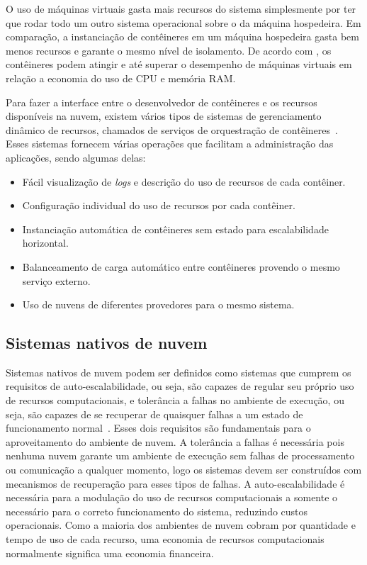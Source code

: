 O uso de máquinas virtuais gasta mais recursos do sistema simplesmente por ter que rodar todo um outro sistema operacional sobre o da máquina hospedeira. Em comparação, a instanciação de contêineres em um máquina hospedeira gasta bem menos recursos e garante o mesmo nível de isolamento. De acordo com  \cite{7095802}, os contêineres podem atingir e até superar o desempenho de máquinas virtuais em relação a economia do uso de CPU e memória RAM. %

Para fazer a interface entre o desenvolvedor de contêineres e os recursos disponíveis na nuvem, existem vários tipos de sistemas de gerenciamento dinâmico de recursos, chamados de serviços de orquestração de contêineres~\citep{Kubernetes,Mesos,Swarm}. Esses sistemas fornecem várias operações que facilitam a administração das aplicações, sendo algumas delas:
\begin{itemize}
    \item Fácil visualização de \textit{logs} e descrição do uso de recursos de cada contêiner.
    \item Configuração individual do uso de recursos por cada contêiner.
    \item Instanciação automática de contêineres sem estado para escalabilidade horizontal.
    \item Balanceamento de carga automático %
    entre contêineres provendo o mesmo serviço externo.
    \item Uso de nuvens de diferentes provedores para o mesmo sistema.
\end{itemize}




\subsection{Sistemas nativos de nuvem}
\label{sec:cloud-native-systems}
Sistemas nativos de nuvem podem ser definidos como sistemas que cumprem os requisitos de auto-escalabilidade, ou seja, são capazes de regular seu próprio uso de recursos computacionais, e tolerância a falhas no ambiente de execução, ou seja, são capazes de se recuperar de quaisquer falhas a um estado de funcionamento normal~\citep{garrison2017cloud,gilbert2018cloud}. Esses dois requisitos são fundamentais para o aproveitamento do ambiente de nuvem. A tolerância a falhas é necessária pois nenhuma nuvem garante um ambiente de execução sem falhas de processamento ou comunicação a qualquer momento, logo os sistemas devem ser construídos com mecanismos de recuperação para esses tipos de falhas. A auto-escalabilidade é necessária para a modulação do uso de recursos computacionais a somente o necessário para o correto funcionamento do sistema, reduzindo custos operacionais. Como a maioria dos ambientes de nuvem cobram por quantidade e tempo de uso de cada recurso, uma economia de recursos computacionais normalmente significa uma economia financeira.


